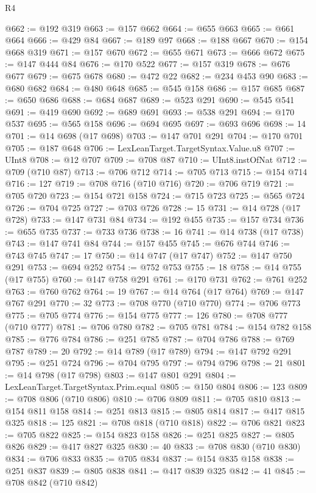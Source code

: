 \begin{lexlean}{R4}
\begin{coremodule}
@662 := @192 @319
@663 := @157 @662
@664 := @655 @663
@665 := @661 @664
@666 := @429 @84
@667 := @189 @97
@668 := @188 @667
@670 := @154 @668 @319
@671 := @157 @670
@672 := @655 @671
@673 := @666 @672
@675 := @147 @444 @84
@676 := @170 @522
@677 := @157 @319
@678 := @676 @677
@679 := @675 @678
@680 := @472 @22
@682 := @234 @453 @90
@683 := @680 @682
@684 := @480 @648
@685 := @545 @158
@686 := @157 @685
@687 := @650 @686
@688 := @684 @687
@689 := @523 @291
@690 := @545 @541
@691 := @419 @690
@692 := @689 @691
@693 := @538 @291
@694 := @170 @537
@695 := @565 @158
@696 := @694 @695
@697 := @693 @696
@698 := 14
@701 := @14 @698 (@17 @698)
@703 := @147 @701 @291
@704 := @170 @701
@705 := @187 @648
@706 := LexLeanTarget.TargetSyntax.Value.u8
@707 := UInt8
@708 := @12 @707
@709 := @708 @87
@710 := UInt8.instOfNat
@712 := @709 (@710 @87)
@713 := @706 @712
@714 := @705 @713
@715 := @154 @714
@716 := 127
@719 := @708 @716 (@710 @716)
@720 := @706 @719
@721 := @705 @720
@723 := @154 @721 @158
@724 := @715 @723
@725 := @565 @724
@726 := @704 @725
@727 := @703 @726
@728 := 15
@731 := @14 @728 (@17 @728)
@733 := @147 @731 @84
@734 := @192 @455
@735 := @157 @734
@736 := @655 @735
@737 := @733 @736
@738 := 16
@741 := @14 @738 (@17 @738)
@743 := @147 @741 @84
@744 := @157 @455
@745 := @676 @744
@746 := @743 @745
@747 := 17
@750 := @14 @747 (@17 @747)
@752 := @147 @750 @291
@753 := @694 @252
@754 := @752 @753
@755 := 18
@758 := @14 @755 (@17 @755)
@760 := @147 @758 @291
@761 := @170 @731
@762 := @761 @252
@763 := @760 @762
@764 := 19
@767 := @14 @764 (@17 @764)
@769 := @147 @767 @291
@770 := 32
@773 := @708 @770 (@710 @770)
@774 := @706 @773
@775 := @705 @774
@776 := @154 @775
@777 := 126
@780 := @708 @777 (@710 @777)
@781 := @706 @780
@782 := @705 @781
@784 := @154 @782 @158
@785 := @776 @784
@786 := @251 @785
@787 := @704 @786
@788 := @769 @787
@789 := 20
@792 := @14 @789 (@17 @789)
@794 := @147 @792 @291
@795 := @251 @724
@796 := @704 @795
@797 := @794 @796
@798 := 21
@801 := @14 @798 (@17 @798)
@803 := @147 @801 @291
@804 := LexLeanTarget.TargetSyntax.Prim.equal
@805 := @150 @804
@806 := 123
@809 := @708 @806 (@710 @806)
@810 := @706 @809
@811 := @705 @810
@813 := @154 @811 @158
@814 := @251 @813
@815 := @805 @814
@817 := @417 @815 @325
@818 := 125
@821 := @708 @818 (@710 @818)
@822 := @706 @821
@823 := @705 @822
@825 := @154 @823 @158
@826 := @251 @825
@827 := @805 @826
@829 := @417 @827 @325
@830 := 40
@833 := @708 @830 (@710 @830)
@834 := @706 @833
@835 := @705 @834
@837 := @154 @835 @158
@838 := @251 @837
@839 := @805 @838
@841 := @417 @839 @325
@842 := 41
@845 := @708 @842 (@710 @842)

\end{coremodule}
\end{lexlean}
